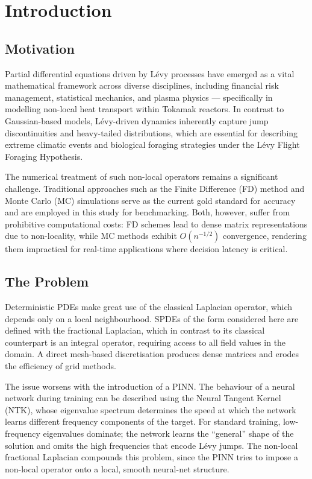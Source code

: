 \documentclass[review,12pt]{elsarticle}
\begin{document}
\section{Introduction}
\label{sec:intro}

\subsection{Motivation}
\label{subsec:motivation}

Partial differential equations driven by L\'evy processes have emerged
as a vital mathematical framework across diverse disciplines, including
financial risk management, statistical mechanics, and plasma physics
--- specifically in modelling non-local heat transport within Tokamak
reactors. In contrast to Gaussian-based models, L\'evy-driven dynamics
inherently capture jump discontinuities and heavy-tailed distributions,
which are essential for describing extreme climatic events and
biological foraging strategies under the L\'evy Flight Foraging
Hypothesis.

The numerical treatment of such non-local operators remains a
significant challenge. Traditional approaches such as the Finite
Difference (FD) method and Monte Carlo (MC) simulations serve as the
current gold standard for accuracy and are employed in this study for
benchmarking. Both, however, suffer from prohibitive computational
costs: FD schemes lead to dense matrix representations due to
non-locality, while MC methods exhibit \(O(n^{-1/2})\) convergence,
rendering them impractical for real-time applications where decision
latency is critical.

\subsection{The Problem}
\label{subsec:problem}

Deterministic PDEs make great use of the classical Laplacian operator,
which depends only on a local neighbourhood. SPDEs of the form
considered here are defined with the fractional Laplacian, which in
contrast to its classical counterpart is an integral operator,
requiring access to all field values in the domain. A direct
mesh-based discretisation produces dense matrices and erodes the
efficiency of grid methods.

The issue worsens with the introduction of a PINN. The behaviour of a
neural network during training can be described using the Neural
Tangent Kernel (NTK), whose eigenvalue spectrum determines the speed
at which the network learns different frequency components of the
target. For standard training, low-frequency eigenvalues dominate; the
network learns the ``general'' shape of the solution and omits the
high frequencies that encode L\'evy jumps. The non-local fractional
Laplacian compounds this problem, since the PINN tries to impose a
non-local operator onto a local, smooth neural-net structure.
\end{document}
